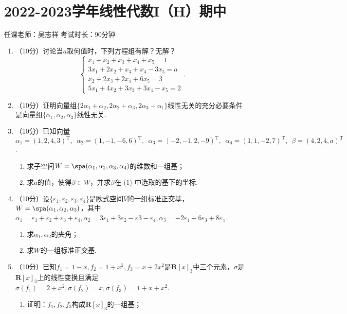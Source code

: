 \section{2022-2023学年线性代数I（H）期中}

\begin{center}
    任课老师：吴志祥\hspace{4em} 考试时长：90分钟
\end{center}

\begin{enumerate}
    \item （10分）讨论当$a$取何值时，下列方程组有解？无解？
	\[\begin{cases}
        x_1+x_2+x_3+x_4+x_5=1 \\
        3x_1+2x_2+x_3+x_4-3x_5=a \\
        x_2+2x_3+2x_4+6x_5=3 \\
        5x_1+4x_2+3x_3+3x_4-x_5=2
    \end{cases}.\]
	\item （10分）证明向量组$\{2\alpha_1+\alpha_2,2\alpha_2+\alpha_3,2\alpha_3+\alpha_1\}$线性无关的充分必要条件是向量组$\{\alpha_1,\alpha_2,\alpha_3\}$线性无关.
	\item （10分）已知向量$\alpha_1=(1,2,4,3)^\mathrm{T},\enspace \alpha_2=(1,-1,-6,6)^\mathrm{T},\enspace \alpha_3=(-2,-1,2,-9)^\mathrm{T},\enspace \alpha_4=(1,1,-2,7)^\mathrm{T},\enspace \beta=(4,2,4,a)^\mathrm{T}$.
    \begin{enumerate}
        \item 求子空间$W=\spa(\alpha_1,\alpha_2,\alpha_3,\alpha_4)$的维数和一组基；

        \item 求$a$的值，使得$\beta\in W$，并求$\beta$在 (1) 中选取的基下的坐标.
    \end{enumerate}
	\item （10分）设$\{\varepsilon_1,\varepsilon_2,\varepsilon_3,\varepsilon_4\}$是欧式空间$V$的一组标准正交基，$W=\spa(\alpha_1,\alpha_2,\alpha_3)$，其中$\alpha_1=\varepsilon_1+\varepsilon_2+\varepsilon_3+\varepsilon_4,\alpha_2=3\varepsilon_1+3\varepsilon_2-\varepsilon3-\varepsilon_4,\alpha_3=-2\varepsilon_1+6\varepsilon_3+8\varepsilon_4$.
	\begin{enumerate}
        \item 求$\alpha_1,\alpha_2$的夹角；

        \item 求$W$的一组标准正交基.
    \end{enumerate}
	\item （10分）已知$f_1=1-x,f_2=1+x^2,f_3=x+2x^2$是$\mathbf{R}[x]_3$中三个元素，$\sigma$是$\mathbf{R}[x]_3$上的线性变换且满足$\sigma(f_1)=2+x^2,\sigma(f_2)=x,\sigma(f_3)=1+x+x^2$.
    \begin{enumerate}
        \item 证明：$f_1,f_2,f_3$构成$\mathbf{R}[x]_3$的一组基；


\end{enumerate}
\end{enumerate}
